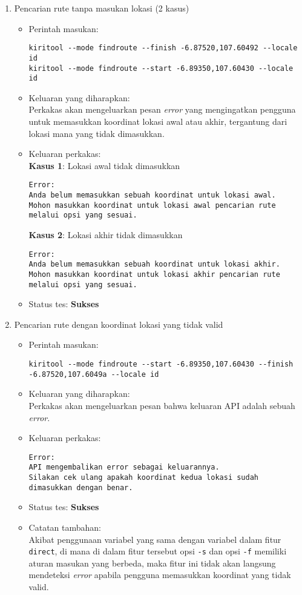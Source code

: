 \begin{enumerate}
	\item Pencarian rute tanpa masukan lokasi (2 kasus)
	\begin{itemize}
		\item Perintah masukan:
		\begin{lstlisting}
kiritool --mode findroute --finish -6.87520,107.60492 --locale id
kiritool --mode findroute --start -6.89350,107.60430 --locale id
		\end{lstlisting}
		\item Keluaran yang diharapkan: \\
		Perkakas akan mengeluarkan pesan \textit{error} yang mengingatkan pengguna untuk memasukkan koordinat \latlon\xspace lokasi awal atau akhir, tergantung dari lokasi mana yang tidak dimasukkan.
		\item Keluaran perkakas: \\
		\textbf{Kasus 1}: Lokasi awal tidak dimasukkan
		\begin{lstlisting}
Error:
Anda belum memasukkan sebuah koordinat untuk lokasi awal.
Mohon masukkan koordinat untuk lokasi awal pencarian rute melalui opsi yang sesuai.
		\end{lstlisting}
		\textbf{Kasus 2}: Lokasi akhir tidak dimasukkan
		\begin{lstlisting}
Error:
Anda belum memasukkan sebuah koordinat untuk lokasi akhir.
Mohon masukkan koordinat untuk lokasi akhir pencarian rute melalui opsi yang sesuai.
		\end{lstlisting}
		\item Status tes: \textbf{Sukses}
	\end{itemize}
	
	\item Pencarian rute dengan koordinat lokasi yang tidak valid
	\begin{itemize}
		\item Perintah masukan:
		\begin{lstlisting}
kiritool --mode findroute --start -6.89350,107.60430 --finish -6.87520,107.6049a --locale id
		\end{lstlisting}
		\item Keluaran yang diharapkan: \\
		Perkakas akan mengeluarkan pesan bahwa keluaran API adalah sebuah \textit{error}.
		\item Keluaran perkakas:
		\begin{lstlisting}
Error:
API mengembalikan error sebagai keluarannya.
Silakan cek ulang apakah koordinat kedua lokasi sudah dimasukkan dengan benar.
		\end{lstlisting}
		\item Status tes: \textbf{Sukses}
		\item Catatan tambahan: \\
		Akibat penggunaan variabel yang sama dengan variabel dalam fitur \verb|direct|, di mana di dalam fitur tersebut opsi \verb|-s| dan opsi \verb|-f| memiliki aturan masukan yang berbeda, maka fitur ini tidak akan langsung mendeteksi \textit{error} apabila pengguna memasukkan koordinat yang tidak valid.
	\end{itemize}
	

\end{enumerate}
